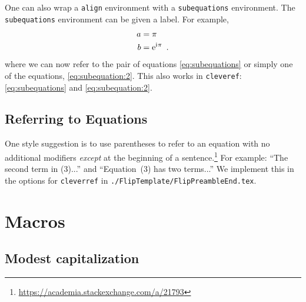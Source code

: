 One can also wrap a \texttt{align} environment with a \texttt{subequations} environment. The \texttt{subequations} environment can be given a label. For example,
\begin{subequations}\label{eq:subequations}
\begin{align}
	a &= \pi 
	\label{eq:subequation:1}
	\\
	b &= \operatorname{e}^{\operatorname{i}\mkern-2mu \pi} 
	\ .
	\label{eq:subequation:2}
\end{align}
\end{subequations}
where we can now refer to the pair of equations \eqref{eq:subequations} or simply one of the equations, \eqref{eq:subequation:2}. This also works in \texttt{cleveref}: \cref{eq:subequations} and \cref{eq:subequation:2}. 


\subsection{Referring to Equations}

One style suggestion is to use parentheses to refer to an equation with no additional modifiers \emph{except} at the beginning of a sentence.\footnote{\url{https://academia.stackexchange.com/a/21793}} For example: ``The second term in (3)...'' and ``Equation~(3) has two terms...'' We implement this in the options for \texttt{cleverref} in \texttt{./FlipTemplate/FlipPreambleEnd.tex}.



\section{Macros}
\label{sec:macros}


\subsection{Modest capitalization}

